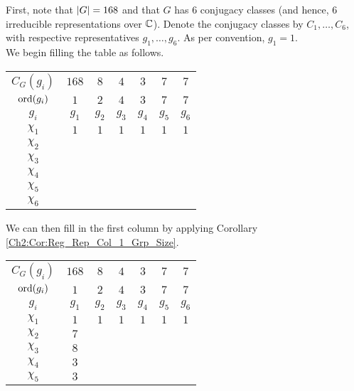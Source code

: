 \begin{boxexample}[Constructing the Character Table of $G = \PSL{2, 7}$]
    First, note that $\left\lvert G \right\rvert = 168$ and that $G$ has $6$ conjugacy classes (and hence, $6$ irreducible representations over $\mathbb{C}$). Denote the conjugacy classes by $C_1, \ldots, C_6$, with respective representatives $g_1, \ldots, g_6$. As per convention, $g_1 = 1$. \\

    We begin filling the table as follows.
    \begin{table}[H]
        \centering
        \begin{tabular}{|c|cccccc|}
            $C_G(g_i)$ & $168$ & $8$ & $4$ & $3$ & $7$ & $7$ \\
            $\operatorname{ord}\!\left( g_i \right)$ & $1$ & $2$ & $4$ & $3$ & $7$ & $7$ \\
            $g_i$ & $g_1$ & $g_2$ & $g_3$ & $g_4$ & $g_5$ & $g_6$ \\
            \hline
            $\chi_1$ & $1$ & $1$ & $1$ & $1$ & $1$ & $1$ \\
            $\chi_2$ & & & & & & \\
            $\chi_3$ & & & & & & \\
            $\chi_4$ & & & & & & \\
            $\chi_5$ & & & & & & \\
            $\chi_6$ & & & & & & \\
        \end{tabular}
    \end{table}
    We can then fill in the first column by applying Corollary \ref{Ch2:Cor:Reg_Rep_Col_1_Grp_Size}.
    \begin{table}[H]
        \centering
        \begin{tabular}{|c|cccccc|}
            $C_G(g_i)$ & $168$ & $8$ & $4$ & $3$ & $7$ & $7$ \\
            $\operatorname{ord}\!\left( g_i \right)$ & $1$ & $2$ & $4$ & $3$ & $7$ & $7$ \\
            $g_i$ & $g_1$ & $g_2$ & $g_3$ & $g_4$ & $g_5$ & $g_6$ \\
            \hline
            $\chi_1$ & $1$ & $1$ & $1$ & $1$ & $1$ & $1$ \\
            $\chi_2$ & $7$ & & & & & \\
            $\chi_3$ & $8$ & & & & & \\
            $\chi_4$ & $3$ & & & & & \\
            $\chi_5$ & $3$ & & & & & \\

\end{tabular}
\end{table}
\end{boxexample}
